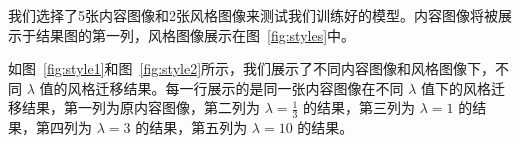 \documentclass[UTF8,openany]{ctexbook}
\begin{document}
我们选择了5张内容图像和2张风格图像来测试我们训练好的模型。内容图像将被展示于结果图的第一列，风格图像展示在图~\ref{fig:styles}中。

如图~\ref{fig:style1}和图~\ref{fig:style2}所示，我们展示了不同内容图像和风格图像下，不同 $\lambda$ 值的风格迁移结果。每一行展示的是同一张内容图像在不同 $\lambda$ 值下的风格迁移结果，第一列为原内容图像，第二列为 $\lambda = \frac{1}{3}$ 的结果，第三列为 $\lambda = 1$ 的结果，第四列为 $\lambda = 3$ 的结果，第五列为 $\lambda = 10$ 的结果。



\begin{figure}[t]
    \centering
\end{figure}
\end{document}
